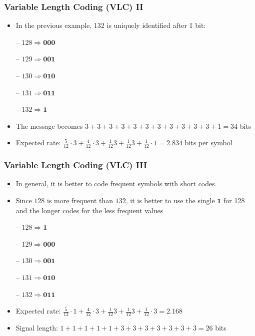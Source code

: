 \documentclass{beamer}
\begin{document}
\begin{frame}
\frametitle{Variable Length Coding (VLC) II}
\begin{itemize}
\item In the previous example, 132 is uniquely identified after 1 bit:

-- $128 \Rightarrow \mathbf{000}$

-- $129 \Rightarrow \mathbf{001}$

-- $130 \Rightarrow \mathbf{010}$

-- $131 \Rightarrow \mathbf{011}$

-- $132 \Rightarrow \mathbf{1}$
\item The message becomes $3+3+3+3+3+3+3+3+3+3+3+1= 34$ bits

\item Expected rate: $\frac{5}{12}\cdot 3 + \frac{4}{12}\cdot 3 + \frac{1}{12} 3 + \frac{1}{12} 3 + \frac{1}{12} \cdot 1 = 2.834$ bits per symbol
\end{itemize}
\end{frame}

\begin{frame}
\frametitle{Variable Length Coding (VLC) III}
\begin{itemize}
\item In general, it is better to code frequent symbols with short codes.
\item Since $128$ is more frequent than $132$, it is better to use 
the single $\mathbf{1}$ for 128 and the longer codes for the less frequent 
values

-- $128 \Rightarrow \mathbf{1}$

-- $129 \Rightarrow \mathbf{000}$

-- $130 \Rightarrow \mathbf{001}$

-- $131 \Rightarrow \mathbf{010}$

-- $132 \Rightarrow \mathbf{011}$

\item Expected rate: $\frac{5}{12}\cdot 1 + \frac{4}{12}\cdot 3 + \frac{1}{12} 3 + \frac{1}{12} 3 + \frac{1}{12} \cdot 3 = 2.168$ 
\item Signal length: $1+1+1+1+1+3+3+3+3+3+3+3=26$ bits
\end{itemize}
\end{frame}
\end{document}

